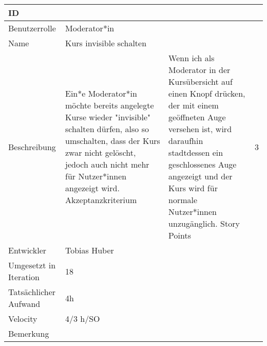 \begin{tabularx}{\textwidth}{|p{}|X|}
	\hline
	ID & \\
	\hline
	Benutzerrolle & Moderator*in\\
	\hline
	Name & Kurs invisible schalten\\
	\hline
	Beschreibung & Ein*e Moderator*in möchte bereits angelegte Kurse wieder "invisible" schalten dürfen, also so umschalten, dass der Kurs zwar nicht gelöscht, jedoch auch nicht mehr für Nutzer*innen angezeigt wird.
	\hline
	Akzeptanzkriterium & Wenn ich als Moderator in der Kursübersicht auf einen Knopf drücken, der mit einem geöffneten Auge versehen ist, wird daraufhin stadtdessen ein geschlossenes Auge angezeigt und der Kurs wird für normale Nutzer*innen unzugänglich.
	\hline
	Story Points & 3\\
	\hline
	Entwickler & Tobias Huber\\
	\hline
	Umgesetzt in Iteration & 18\\
	\hline
	Tatsächlicher Aufwand & 4h\\
	\hline
	Velocity & 4/3 h/SO\\
	\hline
	Bemerkung & \\
	\hline
\end{tabularx}
\vspace{20pt}
